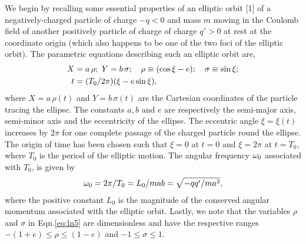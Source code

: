 We begin by recalling some essential properties of an 
elliptic orbit [1] of a negatively-charged particle of 
charge $ -q<0 $ and mass $m$ moving in the Coulomb field of 
another positively particle of charge of charge $ q'>0 $ at 
rest at the coordinate origin (which also happens to be one 
of the two foci of the elliptic orbit). The parametric 
equations describing such an elliptic orbit are,
\begin{align}\label{eq:ln5}
X  &= a\,\rho; ~ Y = b\,\sigma; \quad 
\rho \equiv (\cos \xi - e);  
\quad \sigma \equiv \sin \xi; \notag \\
t&  = (T_{0}/2 \pi)(\xi - e \sin \xi), 
\end{align}
where $X = a\,\rho(t)$ and $Y = b\,\sigma(t)$ are the 
Cartesian coordinates of the particle tracing the ellipse. 
The constants $a, b$ and $e$ are respectively the semi-major 
axis, semi-minor axis and the eccentricity of the ellipse. 
The eccentric angle $\xi = \xi(t)$ increases by $2 \pi$ for 
one complete passage of the charged particle round the 
ellipse. The origin of time has been chosen such that $\xi = 
0$ at $t = 0$ and $\xi = 2 \pi$ at $t = T_{0}$, where 
$T_{0}$ is the period of the elliptic motion. The angular 
frequency ${\omega}_{0}$ associated with $T_{0}$, is given by 
\begin{align*}
{\omega}_{0} = 2 \pi/T_{0} = L_{0}/mab = 
\sqrt{-qq'/ma^{3}}, 
\end{align*}
where the positive constant $L_{0}$ is the magnitude of the 
conserved angular momentum associated with the elliptic 
orbit. Lastly, we note that the variables $\rho$ and 
$\sigma$ in Eqn.\eqref{eq:ln5} are dimensionless and have 
the respective  ranges $-(1+e) \leq \rho \leq (1-e)$ and $-1 
\leq \sigma \leq 1$.

